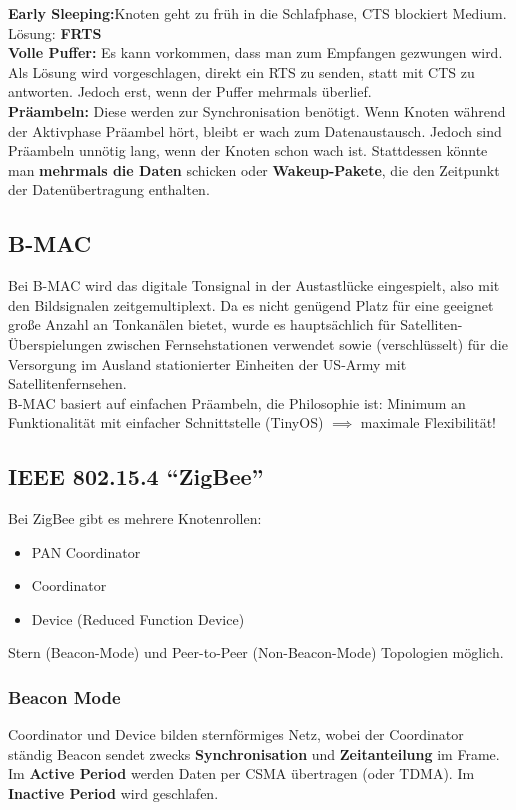 \documentclass[a4paper]{article}
\begin{document}
\textbf{Early Sleeping:}Knoten geht zu früh in die Schlafphase, CTS blockiert Medium. Lösung: \textbf{FRTS}\\
\textbf{Volle Puffer:} Es kann vorkommen, dass man zum Empfangen gezwungen wird. Als Lösung wird vorgeschlagen, direkt ein RTS zu senden, statt mit CTS zu antworten. Jedoch erst, wenn der Puffer mehrmals überlief.\\

\textbf{Präambeln:} Diese werden zur Synchronisation benötigt. Wenn Knoten während der Aktivphase Präambel hört, bleibt er wach zum Datenaustausch. Jedoch sind Präambeln unnötig lang, wenn der Knoten schon wach ist. Stattdessen könnte man \textbf{mehrmals die Daten} schicken oder \textbf{Wakeup-Pakete}, die den Zeitpunkt der Datenübertragung enthalten.

\subsection{B-MAC}
Bei B-MAC wird das digitale Tonsignal in der Austastlücke eingespielt, also mit den Bildsignalen zeitgemultiplext. Da es nicht genügend Platz für eine geeignet große Anzahl an Tonkanälen bietet, wurde es hauptsächlich für Satelliten-Überspielungen zwischen Fernsehstationen verwendet sowie (verschlüsselt) für die Versorgung im Ausland stationierter Einheiten der US-Army mit Satellitenfernsehen. \\

B-MAC basiert auf einfachen Präambeln, die Philosophie ist: Minimum an Funktionalität mit einfacher Schnittstelle (TinyOS) $\implies$ maximale Flexibilität!

\subsection{IEEE 802.15.4 ``ZigBee''}
Bei ZigBee gibt es mehrere Knotenrollen:
\begin{itemize}
	\item PAN Coordinator
	\item Coordinator
	\item Device (Reduced Function Device)
\end{itemize}
Stern (Beacon-Mode) und Peer-to-Peer (Non-Beacon-Mode) Topologien möglich.
\subsubsection{Beacon Mode}
Coordinator und Device bilden sternförmiges Netz, wobei der Coordinator ständig Beacon sendet zwecks \textbf{Synchronisation} und \textbf{Zeitanteilung} im Frame.\\
Im \textbf{Active Period} werden Daten per CSMA übertragen (oder TDMA). Im \textbf{Inactive Period} wird geschlafen.

	
	
	
	
	
	
	
	
	
	
	
	
	
	
	
	
	
	
	
	
	
	
	
	
\end{document}
